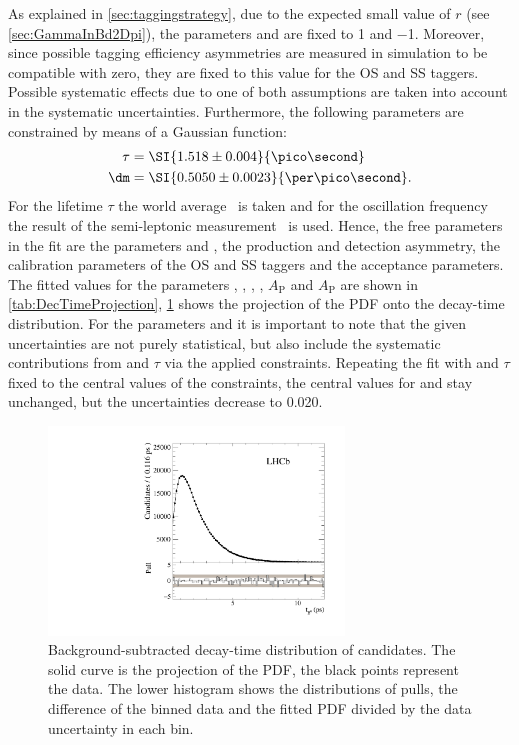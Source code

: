 As explained in \cref{sec:taggingstrategy}, due to the expected small value of $r$ (see \cref{sec:GammaInBd2Dpi}), the parameters \Cf and \Cfbar are fixed to \num{1} and \num{-1}.
Moreover, since possible tagging efficiency asymmetries are measured in simulation to be compatible with zero, they are fixed to this value for the OS and SS taggers.
Possible systematic effects due to one of both assumptions are taken into account in the systematic uncertainties.
Furthermore, the following parameters are constrained by means of a Gaussian function:
\begin{equation}
\begin{aligned}
\tau&=\SI{1.518\pm0.004}{\pico\second}\\
\dm&=\SI{0.5050\pm0.0023}{\per\pico\second}.
\end{aligned}
\end{equation}
For the lifetime $\tau$ the world average~\cite{PDG_2017} is taken and for the oscillation frequency \dm the result of the semi-leptonic \lhcb measurement~\cite{Aaij:2016fdk} is used.
Hence, the free parameters in the fit are the \CP parameters \Sf and \Sfbar, the production and detection asymmetry, the calibration parameters of the OS and SS taggers and the acceptance parameters.
The fitted values for the parameters \Sf, \Sfbar, \dm, \DG, $A_{\text{P}}$ and $A_{\text{P}}$ are shown in \cref{tab:DecTimeProjection}, \cref{fig:DecTimeProjection} shows the projection of the PDF onto the decay-time distribution.
For the \CP parameters \Sf and \Sfbar it is important to note that the given uncertainties are not purely statistical, but also include the systematic contributions from \dm and $\tau$ via the applied constraints.
Repeating the fit with \dm and $\tau$ fixed to the central values of the constraints, the central values for \Sf and \Sfbar stay unchanged, but the uncertainties decrease to \num{0.020}.
\begin{figure}[tbp]
    \centering
    \includegraphics[width=0.7\textwidth]{09TimeFit/figs/BeautyTime_pull.pdf}
    \caption{Background-subtracted decay-time distribution of \BdToDpi candidates.
    The solid curve is the projection of the PDF, the black points represent the data.
    The lower histogram shows the distributions of pulls, \ie the difference of the binned data and the fitted PDF divided by the data uncertainty in each bin.}
    \label{fig:DecTimeProjection}
\end{figure}

